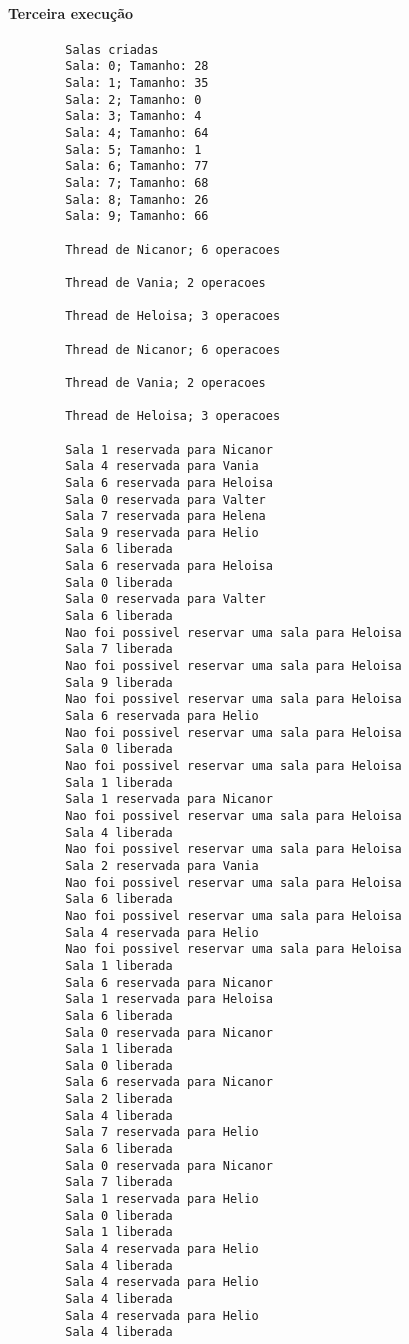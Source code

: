 \documentclass[12pt]{article}
\begin{document}
    \paragraph{Terceira execução}

    \begin{verbatim}
        Salas criadas
        Sala: 0; Tamanho: 28
        Sala: 1; Tamanho: 35
        Sala: 2; Tamanho: 0
        Sala: 3; Tamanho: 4
        Sala: 4; Tamanho: 64
        Sala: 5; Tamanho: 1
        Sala: 6; Tamanho: 77
        Sala: 7; Tamanho: 68
        Sala: 8; Tamanho: 26
        Sala: 9; Tamanho: 66

        Thread de Nicanor; 6 operacoes

        Thread de Vania; 2 operacoes

        Thread de Heloisa; 3 operacoes

        Thread de Nicanor; 6 operacoes

        Thread de Vania; 2 operacoes

        Thread de Heloisa; 3 operacoes

        Sala 1 reservada para Nicanor
        Sala 4 reservada para Vania
        Sala 6 reservada para Heloisa
        Sala 0 reservada para Valter
        Sala 7 reservada para Helena
        Sala 9 reservada para Helio
        Sala 6 liberada
        Sala 6 reservada para Heloisa
        Sala 0 liberada
        Sala 0 reservada para Valter
        Sala 6 liberada
        Nao foi possivel reservar uma sala para Heloisa
        Sala 7 liberada
        Nao foi possivel reservar uma sala para Heloisa
        Sala 9 liberada
        Nao foi possivel reservar uma sala para Heloisa
        Sala 6 reservada para Helio
        Nao foi possivel reservar uma sala para Heloisa
        Sala 0 liberada
        Nao foi possivel reservar uma sala para Heloisa
        Sala 1 liberada
        Sala 1 reservada para Nicanor
        Nao foi possivel reservar uma sala para Heloisa
        Sala 4 liberada
        Nao foi possivel reservar uma sala para Heloisa
        Sala 2 reservada para Vania
        Nao foi possivel reservar uma sala para Heloisa
        Sala 6 liberada
        Nao foi possivel reservar uma sala para Heloisa
        Sala 4 reservada para Helio
        Nao foi possivel reservar uma sala para Heloisa
        Sala 1 liberada
        Sala 6 reservada para Nicanor
        Sala 1 reservada para Heloisa
        Sala 6 liberada
        Sala 0 reservada para Nicanor
        Sala 1 liberada
        Sala 0 liberada
        Sala 6 reservada para Nicanor
        Sala 2 liberada
        Sala 4 liberada
        Sala 7 reservada para Helio
        Sala 6 liberada
        Sala 0 reservada para Nicanor
        Sala 7 liberada
        Sala 1 reservada para Helio
        Sala 0 liberada
        Sala 1 liberada
        Sala 4 reservada para Helio
        Sala 4 liberada
        Sala 4 reservada para Helio
        Sala 4 liberada
        Sala 4 reservada para Helio
        Sala 4 liberada
    \end{verbatim}
\end{document}
